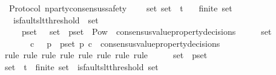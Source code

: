 \begin{isabellebody}
%
\endisadelimproof
\isanewline
\isanewline
{}\isamarkupfalse%
\ {\isacharparenleft}\ Protocol{\isacharparenright}\ n{\isacharunderscore}party{\isacharunderscore}consensus{\isacharunderscore}safety\ {\isacharcolon}\isanewline
\ \ {\isachardoublequoteopen}{\isasymforall}\ {\isasymsigma}{\isacharunderscore}set{\isachardot}\ {\isasymsigma}{\isacharunderscore}set\ {\isasymsubseteq}\ {\isasymSigma}t\isanewline
\ \ {\isasymlongrightarrow}\ finite\ {\isasymsigma}{\isacharunderscore}set\isanewline
\ \ {\isasymlongrightarrow}\ is{\isacharunderscore}faults{\isacharunderscore}lt{\isacharunderscore}threshold\ {\isacharparenleft}{\isasymUnion}\ {\isasymsigma}{\isacharunderscore}set{\isacharparenright}\isanewline
\ \ {\isasymlongrightarrow}\ {\isacharparenleft}{\isasymforall}\ {\isasymsigma}\ p{\isacharunderscore}set{\isachardot}\ {\isasymsigma}\ {\isasymin}\ {\isasymsigma}{\isacharunderscore}set\ {\isasymand}\ p{\isacharunderscore}set\ {\isasymin}\ Pow\ {\isacharparenleft}{\isasymUnion}\ {\isacharbraceleft}consensus{\isacharunderscore}value{\isacharunderscore}property{\isacharunderscore}decisions\ {\isasymsigma}{\isacharprime}\ {\isacharbar}\ {\isasymsigma}{\isacharprime}{\isachardot}\ {\isasymsigma}{\isacharprime}\ {\isasymin}\ {\isasymsigma}{\isacharunderscore}set{\isacharbraceright}{\isacharparenright}\ {\isacharminus}\ {\isacharbraceleft}{\isasymemptyset}{\isacharbraceright}\ \isanewline
\ \ \ \ \ \ {\isasymlongrightarrow}\ {\isacharparenleft}{\isasymlambda}c{\isachardot}\ {\isasymnot}\ {\isacharparenleft}{\isasymforall}\ p\ {\isasymin}\ p{\isacharunderscore}set{\isachardot}\ p\ c{\isacharparenright}{\isacharparenright}\ {\isasymnotin}\ consensus{\isacharunderscore}value{\isacharunderscore}property{\isacharunderscore}decisions\ {\isasymsigma}{\isacharparenright}{\isachardoublequoteclose}\isanewline
%
\isadelimproof
\ \ %
\endisadelimproof
%
\isatagproof
{}\isamarkupfalse%
\ {\isacharparenleft}rule{\isacharcomma}\ rule{\isacharcomma}\ rule{\isacharcomma}\ rule{\isacharcomma}\ rule{\isacharcomma}\ rule{\isacharcomma}\ rule{\isacharcomma}\ rule{\isacharparenright}\isanewline
{}\isamarkupfalse%
\ {\isacharminus}\isanewline
\ \ \isamarkupfalse%
\ {\isasymsigma}{\isacharunderscore}set\ {\isasymsigma}\ p{\isacharunderscore}set\isanewline
\ \ \isamarkupfalse%
\ {\isachardoublequoteopen}{\isasymsigma}{\isacharunderscore}set\ {\isasymsubseteq}\ {\isasymSigma}t{\isachardoublequoteclose}\ \ {\isachardoublequoteopen}finite\ {\isasymsigma}{\isacharunderscore}set{\isachardoublequoteclose}\ \ {\isachardoublequoteopen}is{\isacharunderscore}faults{\isacharunderscore}lt{\isacharunderscore}threshold\ {\isacharparenleft}{\isasymUnion}{\isasymsigma}{\isacharunderscore}set{\isacharparenright}{\isachardoublequoteclose}\ \isanewline

\end{isabellebody}
